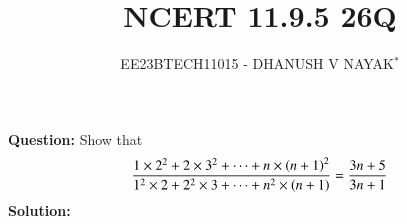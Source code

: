 \documentclass[journal,12pt,twocolumn]{IEEEtran}
\theoremstyle{remark}
\begin{document}

\vspace{3cm}

\title{NCERT 11.9.5 26Q}
\author{EE23BTECH11015 - DHANUSH V NAYAK$^{*}$%
}
\maketitle
\newpage
\bigskip

\renewcommand{\thefigure}{\arabic{figure}}
\renewcommand{\thetable}{\theenumi}


\textbf{Question:} Show that
\begin{equation}
    \frac{1\times2^2 + 2\times3^2 + \dots + n\times\left(n+1\right)^2}{1^2\times2 + 2^2\times3 +\dots + n^2\times\left(n+1\right)}  = \frac{3n+5}{3n+1}\notag
\end{equation}
\textbf{Solution:}

\end{document}
